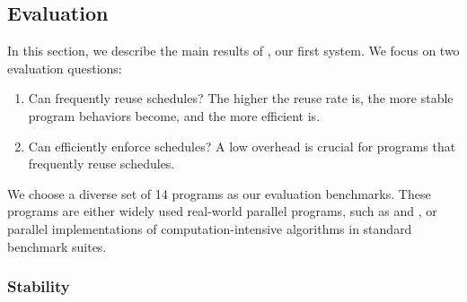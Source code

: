 \subsection{\tern Evaluation} \label{sec:tern-eval}
In this section, we describe the main results of \tern, our first \smt
system.  We focus on two evaluation questions:

\begin{enumerate}

\item[\S\ref{sec:tern-stable}:] Can \tern frequently reuse schedules?  The
  higher the reuse rate is, the more stable program behaviors become, and
  the more efficient \tern is.

\item[\S\ref{sec:tern-efficient}:] Can \tern efficiently enforce schedules?  A
  low overhead is crucial for programs that frequently reuse schedules.




\end{enumerate}

We choose a diverse set of 14 programs as our evaluation benchmarks.
These programs are either widely used real-world parallel programs, such
as \apache and \pbzip, or parallel
implementations of computation-intensive algorithms in standard benchmark
suites.

\subsubsection{Stability} \label{sec:tern-stable}

